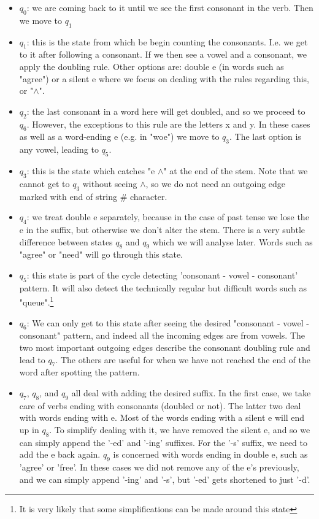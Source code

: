 \documentclass[11pt,journal]{article}
\begin{document}
	\begin{itemize}
		\item $q_0$: we are coming back to it until we see the first consonant in the verb. Then we move to $q_1$
		
		\item $q_1$: this is the state from which be begin counting the consonants. I.e. we get to it after following a consonant. If we then see a vowel and a consonant, we apply the doubling rule. Other options are: double e (in words such as "agree") or a silent e where we focus on dealing with the rules regarding this, or "$\wedge$".
		
		\item $q_2$: the last consonant in a word here will get doubled, and so we proceed to $q_6$. However, the exceptions to this rule are the letters x and y. In these cases as well as a word-ending e (e.g. in "woe") we move to $q_3$. The last option is any vowel, leading to $q_5$.
		
		\item $q_3$: this is the state which catches "e $\wedge$" at the end of the stem. Note that we cannot get to $q_3$ without seeing $\wedge$, so we do not need an outgoing edge marked with end of string \# character.
		
		\item $q_4$: we treat double e separately, because in the case of past tense we lose the e in the suffix, but otherwise we don't alter the stem. There is a  very subtle difference between states $q_8$ and $q_9$ which we will analyse later. Words such as "agree" or "need" will go through this state.
	
		\item $q_5$: this state is part of the cycle detecting 'consonant - vowel - consonant' pattern. It will also detect the technically regular but difficult words such as "queue".\footnote{It is very likely that some simplifications can be made around this state}
		
		\item $q_6$: We can only get to this state after seeing the desired "consonant - vowel - consonant" pattern, and indeed all the incoming edges are from vowels. The two most important outgoing edges describe the consonant doubling rule and lead to $q_7$. The others are useful for when we have not reached the end of the word after spotting the pattern.
		
		\item $q_7$, $q_8$, and $q_9$ all deal with adding the desired suffix. In the first case, we take care of verbs ending with consonants (doubled or not). The latter two deal with words ending with e. Most of the words ending with a silent e will end up in $q_8$. To simplify dealing with it, we have removed the silent e, and so we can simply append the '-ed' and '-ing' suffixes. For the '-s' suffix, we need to add the e back again. $q_9$ is concerned with words ending in double e, such as 'agree' or 'free'. In these cases we did not remove any of the e's previously, and we can simply append '-ing' and '-s', but '-ed' gets shortened to just '-d'.
		

\end{itemize}
\end{document}
